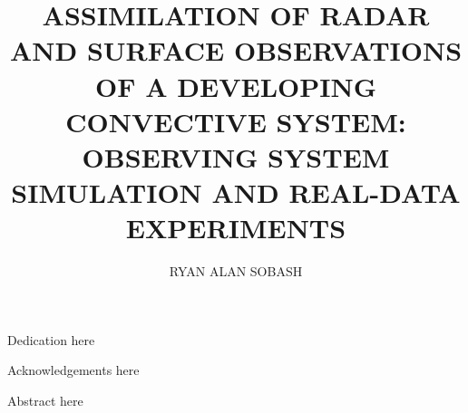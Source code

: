 \documentclass[letter,12pt,dissertation]{OUdissertation}
\begin{document}
\title{ASSIMILATION OF RADAR AND SURFACE OBSERVATIONS OF A DEVELOPING CONVECTIVE SYSTEM: OBSERVING SYSTEM SIMULATION AND REAL-DATA EXPERIMENTS}
\author{RYAN ALAN SOBASH}

\setlength{\parindent}{0.5in}
\graphicspath{{/Users/rsobash/Desktop/disserfigs/}}
\let\savedCaption=\caption
\renewcommand{\caption}[1]{\normalsize\OUsinglespace\savedCaption{#1}}

\begin{preface}
Dedication here

Acknowledgements here

\tableofcontents
\listoftables
\listoffigures
{}
Abstract here
\end{preface}















%
%


\appendix


\end{document}
